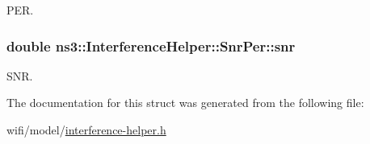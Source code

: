 P\+ER. 

\subsubsection[{\texorpdfstring{snr}{snr}}]{\setlength{\rightskip}{0pt plus 5cm}double ns3\+::\+Interference\+Helper\+::\+Snr\+Per\+::snr}\hypertarget{structns3_1_1InterferenceHelper_1_1SnrPer_a8ad3288a62949ad678c08a64f2e1e655}{}\label{structns3_1_1InterferenceHelper_1_1SnrPer_a8ad3288a62949ad678c08a64f2e1e655}


S\+NR. 



The documentation for this struct was generated from the following file\+:\begin{DoxyCompactItemize}
\item 
wifi/model/\hyperlink{interference-helper_8h}{interference-\/helper.\+h}\end{DoxyCompactItemize}
